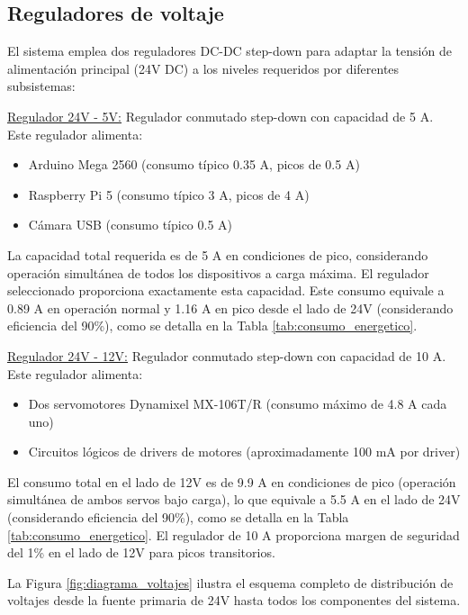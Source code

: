 \subsection{Reguladores de voltaje}

El sistema emplea dos reguladores DC-DC step-down para adaptar la tensión de alimentación principal (24V DC) a los niveles requeridos por diferentes subsistemas:

\underline{Regulador 24V - 5V:} Regulador conmutado step-down con capacidad de 5 A. Este regulador alimenta:
\begin{itemize}[label=$\bullet$]
\item Arduino Mega 2560 (consumo típico 0.35 A, picos de 0.5 A)
\item Raspberry Pi 5 (consumo típico 3 A, picos de 4 A)
\item Cámara USB (consumo típico 0.5 A)
\end{itemize}

La capacidad total requerida es de 5 A en condiciones de pico, considerando operación simultánea de todos los dispositivos a carga máxima. El regulador seleccionado proporciona exactamente esta capacidad. Este consumo equivale a 0.89 A en operación normal y 1.16 A en pico desde el lado de 24V (considerando eficiencia del 90\%), como se detalla en la Tabla \ref{tab:consumo_energetico}.

\underline{Regulador 24V - 12V:} Regulador conmutado step-down con capacidad de 10 A. Este regulador alimenta:
\begin{itemize}[label=$\bullet$]
    \item Dos servomotores Dynamixel MX-106T/R (consumo máximo de 4.8 A cada uno)
    \item Circuitos lógicos de drivers de motores (aproximadamente 100 mA por driver)
\end{itemize}

El consumo total en el lado de 12V es de 9.9 A en condiciones de pico (operación simultánea de ambos servos bajo carga), lo que equivale a 5.5 A en el lado de 24V (considerando eficiencia del 90\%), como se detalla en la Tabla \ref{tab:consumo_energetico}. El regulador de 10 A proporciona margen de seguridad del 1\% en el lado de 12V para picos transitorios.

La Figura \ref{fig:diagrama_voltajes} ilustra el esquema completo de distribución de voltajes desde la fuente primaria de 24V hasta todos los componentes del sistema.

